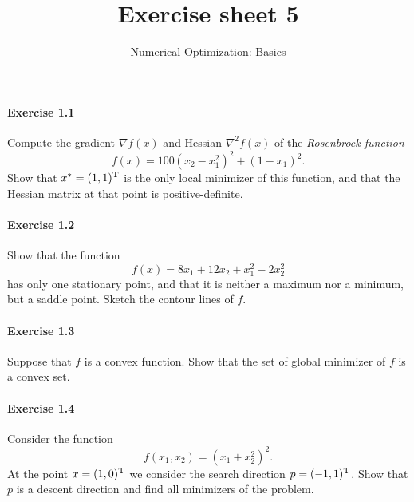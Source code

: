 
\title{Exercise sheet 5}
\subtitle{Numerical Optimization: Basics}
\usepackage{amsmath}
\newcommand\tp{\ensuremath{\text{\upshape T}}}

\maketitle

\paragraph{Exercise 1.1} %
Compute  the gradient $\nabla f(x)$ and Hessian $\nabla^2f(x)$ of the
\emph{Rosenbrock function}
\begin{equation}\label{eq:rosenbrock}
  f(x) = 100(x_2-x_1^2)^2 + (1-x_1)^2.
\end{equation}
Show that $x^*=(1,1)^\tp$ is the only local minimizer of this function, and
that the Hessian matrix at that point is positive-definite.

\paragraph{Exercise 1.2} %
Show that the function
\[
  f(x) = 8x_1 + 12x_2 + x_1^2 - 2x_2^2
\]
has only one stationary point, and that it is neither a maximum nor a minimum,
but a saddle point. Sketch the contour lines of $f$.

\paragraph{Exercise 1.3} %
Suppose that $f$ is a convex function. Show that the set of global minimizer
of $f$ is a convex set.

\paragraph{Exercise 1.4} %
Consider the function
\[
  f(x_1, x_2) = (x_1+x_2^2)^2.
\]
At the point $x=(1,0)^\tp$ we consider the search direction $p=(-1,1)^\tp$.
Show that $p$ is a descent direction and find all minimizers of the problem.

